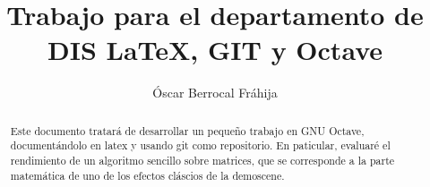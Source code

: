 \documentclass[a4,12pt]{article}
\title{Trabajo para el departamento de DIS \newline
\LaTeX, GIT y Octave}
\author{Óscar Berrocal Fráhija}
\begin{document}
\maketitle



\begin{abstract}
Este documento tratará de desarrollar un pequeño trabajo en GNU Octave, documentándolo en latex y usando git como repositorio. En paticular, evaluaré el rendimiento de un algoritmo sencillo sobre matrices, que se corresponde a la parte matemática de uno de los efectos cláscios de la demoscene.
\end{abstract}

\tableofcontents

\listoffigures

\newpage
\end{document}
